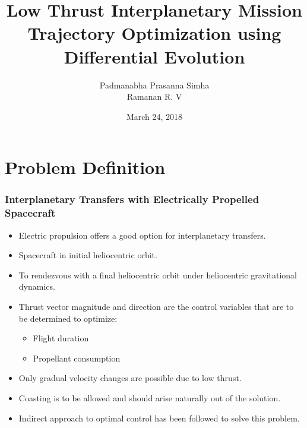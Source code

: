 \documentclass{beamer}
\title[Low Thrust Interplanetary Trajectory Optimization using DE]{Low Thrust Interplanetary Mission Trajectory Optimization using Differential Evolution} %
\author[Padmanbha Prasanna Simha, Ramanan R. V (IIST)]{Padmanabha Prasanna Simha\\Ramanan R. V} %
\institute[IIST] %
{
Indian Institute of Space Science and Technology \\ for\\ National Conference on Multidisciplinary Design, Analysis and Optimization\\ (Indian Institute of Science - Bangalore)%
\medskip
}
\date{March 24, 2018} %
\begin{document}
\begin{frame}
\titlepage %
\end{frame}



\section{Problem Definition}
\begin{frame}
	\frametitle{Interplanetary Transfers with Electrically Propelled Spacecraft}
	\begin{itemize}
		\vspace{-3mm}
		\item Electric propulsion offers a good option for interplanetary transfers.
		\item Spacecraft in initial heliocentric orbit.
		\item To rendezvous with a final heliocentric orbit under heliocentric gravitational dynamics.
		\item Thrust vector magnitude and direction are the control variables that are to be determined to optimize:
		\begin{itemize}
			\item Flight duration
			\item Propellant consumption
		\end{itemize}
		\item Only gradual velocity changes are possible due to low thrust.
		\item Coasting is to be allowed and should arise naturally out of the solution.
		\item Indirect approach to optimal control has been followed to solve this problem.
	\end{itemize}
\end{frame}
\end{document}
